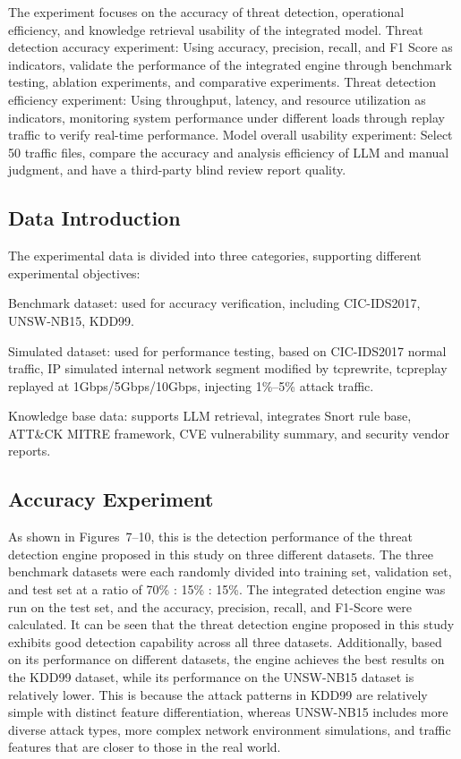 \documentclass[sigconf,authordraft]{acmart}
\begin{document}
The experiment focuses on the accuracy of threat detection, operational efficiency, and knowledge retrieval usability of the integrated model. Threat detection accuracy experiment: Using accuracy, precision, recall, and F1 Score as indicators, validate the performance of the integrated engine through benchmark testing, ablation experiments, and comparative experiments. Threat detection efficiency experiment: Using throughput, latency, and resource utilization as indicators, monitoring system performance under different loads through replay traffic to verify real-time performance. Model overall usability experiment: Select 50 traffic files, compare the accuracy and analysis efficiency of LLM and manual judgment, and have a third-party blind review report quality.

\subsection{Data Introduction}

The experimental data is divided into three categories, supporting different experimental objectives:

Benchmark dataset: used for accuracy verification, including CIC-IDS2017, UNSW-NB15, KDD99.

Simulated dataset: used for performance testing, based on CIC-IDS2017 normal traffic, IP simulated internal network segment modified by tcprewrite, tcpreplay replayed at 1Gbps/5Gbps/10Gbps, injecting 1\%--5\% attack traffic.

Knowledge base data: supports LLM retrieval, integrates Snort rule base, ATT\&CK MITRE framework, CVE vulnerability summary, and security vendor reports.

\subsection{Accuracy Experiment}

As shown in Figures~7--10, this is the detection performance of the threat detection engine proposed in this study on three different datasets. The three benchmark datasets were each randomly divided into training set, validation set, and test set at a ratio of 70\% : 15\% : 15\%. The integrated detection engine was run on the test set, and the accuracy, precision, recall, and F1-Score were calculated. It can be seen that the threat detection engine proposed in this study exhibits good detection capability across all three datasets. Additionally, based on its performance on different datasets, the engine achieves the best results on the KDD99 dataset, while its performance on the UNSW-NB15 dataset is relatively lower. This is because the attack patterns in KDD99 are relatively simple with distinct feature differentiation, whereas UNSW-NB15 includes more diverse attack types, more complex network environment simulations, and traffic features that are closer to those in the real world.
\end{document}
